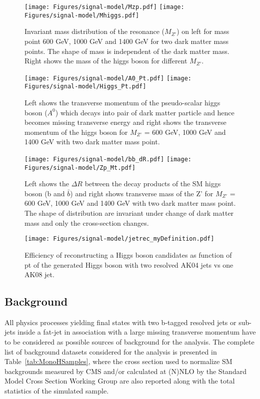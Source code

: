 \begin{figure}[htbp]
\centering
\texttt{[image: Figures/signal-model/Mzp.pdf]}
\texttt{[image: Figures/signal-model/Mhiggs.pdf]}
\caption{Invariant mass distribution of the resonance ($M_{Z'}$) on left for mass point 600 GeV, 1000 GeV and 1400 GeV for two dark matter mass points. The shape of mass is independent of the dark matter mass. Right shows the mass of the higgs boson for different $M_{Z'}$. }
\label{fig:lhemass}
\end{figure}

\begin{figure}[htbp]
\centering
\texttt{[image: Figures/signal-model/A0\_Pt.pdf]}
\texttt{[image: Figures/signal-model/Higgs\_Pt.pdf]}
\caption{Left shows the transverse momentum of the pseudo-scalar higgs boson ($A^{0}$) which decays into pair of dark matter particle and hence becomes missing transverse 
energy and right shows the transverse momentum of the higgs boson for $M_{Z'}$ = 600 GeV, 1000 GeV and 1400 GeV with two dark matter mass point. }
\label{fig:lheMETAndHpT}
\end{figure}


\begin{figure}[htbp]
\centering
\texttt{[image: Figures/signal-model/bb\_dR.pdf]}
\texttt{[image: Figures/signal-model/Zp\_Mt.pdf]}
\caption{Left shows the $\Delta R$ between the decay products of the SM higgs boson (b and $\bar{b}$) and right shows transverse mass of the Z' for $M_{Z'}$ = 600 GeV, 1000 GeV and 1400 GeV with two dark matter mass point. The shape of distribution are invariant under change of dark matter mass and only the cross-section changes.}
\label{lhe:DRMT}
\end{figure}

\begin{figure}[htbp]
\centering
\texttt{[image: Figures/signal-model/jetrec\_myDefinition.pdf]}
\caption{Efficiency of reconstructing a Higgs boson candidates as function of pt of the generated Higgs boson with two resolved AK04 jets vs one AK08 jet.}
\label{fig:effVsPt}
\end{figure}

\newpage

\subsection{Background}
All physics processes yielding final states with two b-tagged resolved jets or sub-jets inside a fat-jet in association with a large missing transverse momentum 
have to be considered as possible sources of background for the analysis. The complete list of background datasets considered for the analysis is presented in 
Table~\ref{tab:MonoHSamples},  where the cross section used to normalize SM backgrounds
measured by CMS and/or calculated at (N)NLO by the Standard Model Cross Section Working
Group \cite{smcross-sectwiki} are also reported along with the total statistics of the simulated sample. 

